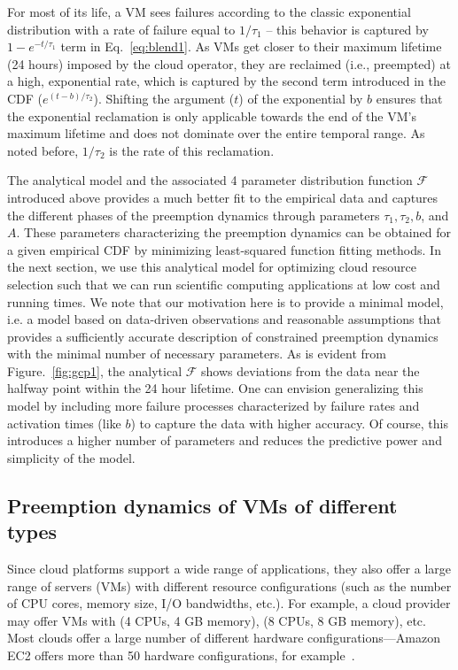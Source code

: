 For most of its life, a VM sees failures according to the classic exponential distribution with a rate of failure equal to $1/\tau_1$ -- this behavior is captured by $1-e^{-t/\tau_1}$ term in Eq.~\ref{eq:blend1}. 
As VMs get closer to their maximum lifetime (24 hours) imposed by the cloud operator, they are reclaimed (i.e., preempted) at a high, exponential rate, which is captured by the second term introduced in the CDF ($e^{(t-b)/\tau_2}$). 
Shifting the argument ($t$) of the exponential by $b$ ensures that the exponential reclamation is only applicable towards the end of the VM's maximum lifetime and does not dominate over the entire temporal range. As noted before, $1/\tau_2$ is the rate of this reclamation.

The analytical model and the associated 4 parameter distribution function $\mathscr{F}$ introduced above provides a much better fit to the empirical data and captures the different phases of the preemption dynamics through parameters $\tau_1, \tau_2, b$, and $A$. These parameters characterizing the preemption dynamics can be obtained for a given empirical CDF by minimizing least-squared function fitting methods. \footnotemark 
%
%
In the next section, we use this analytical model for optimizing cloud resource selection such that we can run scientific computing applications at low cost and running times.
We note that our motivation here is to provide a minimal model, i.e. a model based on data-driven observations and reasonable assumptions that provides a sufficiently accurate description of constrained preemption dynamics with the minimal number of necessary parameters.
As is evident from Figure.~\ref{fig:gcp1}, the analytical $\mathscr{F}$ shows deviations from the data near the halfway point within the 24 hour lifetime.
One can envision generalizing this model by including more failure processes characterized by failure rates and activation times (like $b$) to capture the data with higher accuracy.
Of course, this introduces a higher number of parameters and reduces the predictive power and simplicity of the model. 


\subsection{Preemption dynamics of VMs of different types}
\label{subsec:types-dynamics}
Since cloud platforms support a wide range of applications, they also offer a large range of servers (VMs) with different resource configurations (such as the number of CPU cores, memory size, I/O bandwidths, etc.). 
For example, a cloud provider may offer VMs with (4 CPUs, 4 GB memory), (8 CPUs, 8 GB memory), etc.
Most clouds offer a large number of different hardware configurations---Amazon EC2 offers more than 50 hardware configurations, for example~\cite{amazon-ec2-instance-types}.

